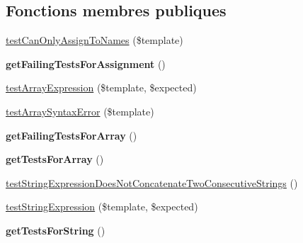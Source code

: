\subsection*{Fonctions membres publiques}
\begin{DoxyCompactItemize}
\item 
\hyperlink{class_twig___tests___expression_parser_test_a81f72d4221542b348a04359119a74436}{test\+Can\+Only\+Assign\+To\+Names} (\$template)
\item 
{\bfseries get\+Failing\+Tests\+For\+Assignment} ()\hypertarget{class_twig___tests___expression_parser_test_a17aca66f4c2b81a8eb7c59261da7535f}{}\label{class_twig___tests___expression_parser_test_a17aca66f4c2b81a8eb7c59261da7535f}

\item 
\hyperlink{class_twig___tests___expression_parser_test_a9cb5d21764cc572bb420fa1175d4098b}{test\+Array\+Expression} (\$template, \$expected)
\item 
\hyperlink{class_twig___tests___expression_parser_test_adc051445e408c1364a24325efe093202}{test\+Array\+Syntax\+Error} (\$template)
\item 
{\bfseries get\+Failing\+Tests\+For\+Array} ()\hypertarget{class_twig___tests___expression_parser_test_a4f906a3ac5b6e860e8bf4f65c5b3f4c9}{}\label{class_twig___tests___expression_parser_test_a4f906a3ac5b6e860e8bf4f65c5b3f4c9}

\item 
{\bfseries get\+Tests\+For\+Array} ()\hypertarget{class_twig___tests___expression_parser_test_a98055283298f4f1301a05695f04e2850}{}\label{class_twig___tests___expression_parser_test_a98055283298f4f1301a05695f04e2850}

\item 
\hyperlink{class_twig___tests___expression_parser_test_ada329210f3a0aa7f834d7049def9ad96}{test\+String\+Expression\+Does\+Not\+Concatenate\+Two\+Consecutive\+Strings} ()
\item 
\hyperlink{class_twig___tests___expression_parser_test_a427d7fd7e685217548447bf6c9d95cf9}{test\+String\+Expression} (\$template, \$expected)
\item 
{\bfseries get\+Tests\+For\+String} ()\hypertarget{class_twig___tests___expression_parser_test_ae0020fb2fb5857846d7772105935c47a}{}\label{class_twig___tests___expression_parser_test_ae0020fb2fb5857846d7772105935c47a}


\end{DoxyCompactItemize}
